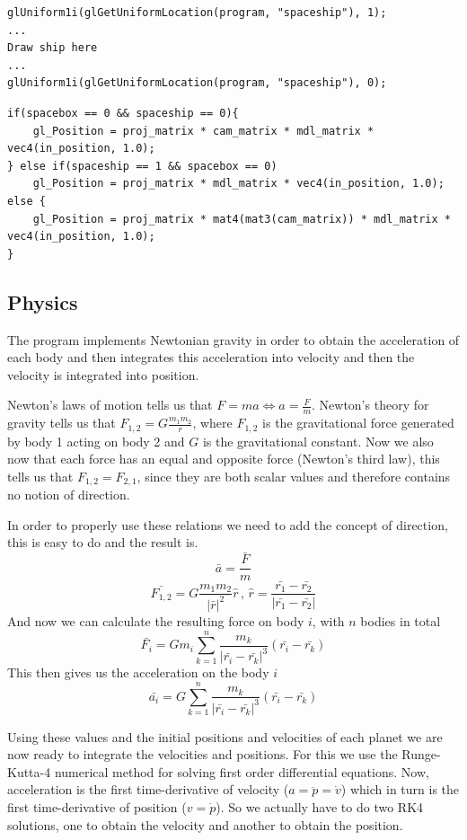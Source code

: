 \documentclass[a4paper,12pt]{article}
\begin{document}
\begin{lstlisting}[caption={Draw spaceship}, label={lst:ship}]
glUniform1i(glGetUniformLocation(program, "spaceship"), 1);
...
Draw ship here
...
glUniform1i(glGetUniformLocation(program, "spaceship"), 0);
\end{lstlisting}

\begin{lstlisting}[caption={Vertex shader}, label={lst:vert}]
if(spacebox == 0 && spaceship == 0){
    gl_Position = proj_matrix * cam_matrix * mdl_matrix * vec4(in_position, 1.0);
} else if(spaceship == 1 && spacebox == 0)
    gl_Position = proj_matrix * mdl_matrix * vec4(in_position, 1.0);
else {
    gl_Position = proj_matrix * mat4(mat3(cam_matrix)) * mdl_matrix * vec4(in_position, 1.0);
} 
\end{lstlisting}

\subsection{Physics}
The program implements Newtonian gravity in order to obtain the acceleration of
each body and then integrates this acceleration into velocity and then the
velocity is integrated into position.

Newton's laws of motion tells us that $F=ma \Leftrightarrow a = \frac{F}{m}$.
Newton's theory for gravity tells us that $F_{1,2} = G\frac{m_1m_2}{r}$, where
$F_{1,2}$ is the gravitational force generated by body 1 acting on body 2 and
$G$ is the gravitational constant. Now we also now that each force has an equal
and opposite force (Newton's third law), this tells us that $F_{1,2} =
F_{2,1}$, since they are both scalar values and therefore contains no notion of
direction.

In order to properly use these relations we need to add the concept of
direction, this is easy to do and the result is.
\[
\bar{a} = \frac{\bar{F}}{m}
\]
\[
\bar{F_{1,2}} = G\frac{m_1m_2}{|\bar{r}|^2}\hat{r} \, , \, \hat{r} = \frac{\bar{r_1} - \bar{r_2}}{|\bar{r_1} - \bar{r_2}|}
\]
And now we can calculate the resulting force on body $i$, with $n$ bodies in total
\[
\bar{F_i} = G m_i\sum_{k=1}^n \frac{m_k}{|\bar{r_i} - \bar{r_k}|^3}\left( \bar{r_i} - \bar{r_k} \right)
\]
This then gives us the acceleration on the body $i$
\[
\bar{a_i} = G \sum_{k=1}^n \frac{m_k}{|\bar{r_i} - \bar{r_k}|^3}\left( \bar{r_i} - \bar{r_k} \right)
\]

Using these values and the initial positions and velocities of each planet we
are now ready to integrate the velocities and positions. For this we use the
Runge-Kutta-4 numerical method for solving first order differential equations.
Now, acceleration is the first time-derivative of velocity ($a=\ddot{p} =
\dot{v}$) which in turn is the first time-derivative of position ($v=\dot{p}$).
So we actually have to do two RK4 solutions, one to obtain the velocity and
another to obtain the position.
\end{document}
